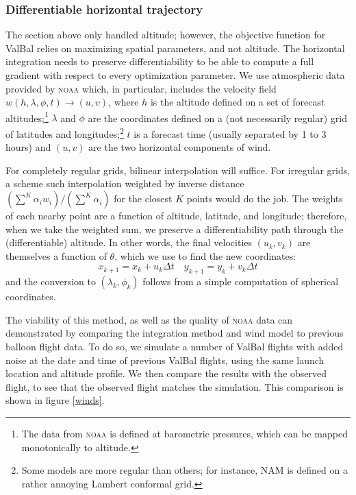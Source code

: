 \documentclass[11pt]{scrartcl} %
\begin{document}
\subsubsection{Differentiable horizontal trajectory} \label{sec:horizontal}
The section above only handled altitude; however, the objective function for ValBal relies on maximizing spatial parameters, and not altitude. The horizontal integration needs to preserve differentiability to be able to compute a full gradient with respect to every optimization parameter. We use atmospheric data provided by \textsc{noaa} \cite{GFS} which, in particular, includes the velocity field $w(h, \lambda, \phi, t)\to(u, v)$, where $h$ is the altitude defined on a set of forecast altitudes;\footnote{The data from \textsc{noaa} is defined at barometric pressures, which can be mapped monotonically to altitude.} $\lambda$ and $\phi$ are the coordinates defined on a (not necessarily regular) grid of latitudes and longitudes;\footnote{Some models are more regular than others; for instance, NAM is defined on a rather annoying Lambert conformal grid.} $t$ is a forecast time (usually separated by 1 to 3 hours) and $(u, v)$ are the two horizontal components of wind.

For completely regular grids, bilinear interpolation will suffice. For irregular grids, a scheme such interpolation weighted by inverse distance $(\sum^K \alpha_i w_i)/(\sum^K \alpha_i)$ for the closest $K$ points would do the job. The weights of each nearby point are a function of altitude, latitude, and longitude; therefore, when we take the weighted sum, we preserve a differentiability path through the (differentiable) altitude. In other words, the final velocities $(u_k, v_k)$ are themselves a function of $\theta$, which we use to find the new coordinates:
\[x_{k+1} = x_k + u_k\Delta t\quad y_{k+1} = y_k + v_k\Delta t\]
and the conversion to $(\lambda_k, \phi_k)$ follows from a simple computation of spherical coordinates. 

The viability of this method, as well as the quality of \textsc{noaa} data can demonstrated by comparing the integration method and wind model to previous balloon flight data. To do so, we simulate a number of ValBal flights with added noise at the date and time of previous ValBal flights, using the same launch location and altitude profile. We then compare the results with the observed flight, to see that the observed flight matches the simulation. This comparison is shown in figure \ref{winds}.
\end{document}
